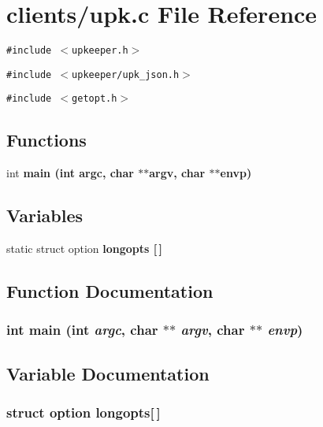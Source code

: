 \section{clients/upk.c File Reference}
\label{clients_2upk_8c}
{\tt \#include $<$upkeeper.h$>$}\par
{\tt \#include $<$upkeeper/upk\_\-json.h$>$}\par
{\tt \#include $<$getopt.h$>$}\par
\subsection*{Functions}
\begin{CompactItemize}
\item 
int \bf{main} (int argc, char $\ast$$\ast$argv, char $\ast$$\ast$envp)
\end{CompactItemize}
\subsection*{Variables}
\begin{CompactItemize}
\item 
static struct option \bf{longopts} [$\,$]
\end{CompactItemize}


\subsection{Function Documentation}
\subsubsection{\setlength{\rightskip}{0pt plus 5cm}int main (int {\em argc}, char $\ast$$\ast$ {\em argv}, char $\ast$$\ast$ {\em envp})}\label{clients_2upk_8c_68756ae265b94f9b45ae43ccf35d3b89}




\subsection{Variable Documentation}
\subsubsection{\setlength{\rightskip}{0pt plus 5cm}struct option \bf{longopts}[$\,$]\hspace{0.3cm}{\tt  [static]}}\label{clients_2upk_8c_4eddc44a227b088a6e62fe56020e2cf1}


